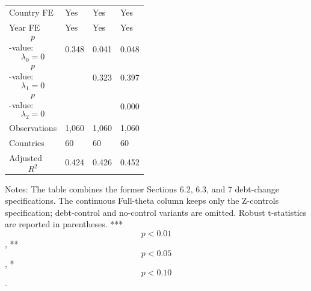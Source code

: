 \begin{table}[H]
\begin{threeparttable}
\begin{tabularx}{\textwidth}{lYYY}
Country FE & Yes & Yes & Yes \\
Year FE & Yes & Yes & Yes \\
$$p$$-value: $$\lambda_0=0$$ & 0.348 & 0.041 & 0.048 \\
$$p$$-value: $$\lambda_1=0$$ &  & 0.323 & 0.397 \\
$$p$$-value: $$\lambda_2=0$$ &  &  & 0.000 \\
Observations & 1,060 & 1,060 & 1,060 \\
Countries & 60 & 60 & 60 \\
Adjusted $$R^2$$ & 0.424 & 0.426 & 0.452 \\
\bottomrule
\end{tabularx}
\begin{tablenotes}[flushleft]\footnotesize
\item Notes: The table combines the former Sections 6.2, 6.3, and 7 debt-change specifications. The continuous Full-theta column keeps only the Z-controls specification; debt-control and no-control variants are omitted. Robust t-statistics are reported in parentheses. *** $$p<0.01$$, ** $$p<0.05$$, * $$p<0.10$$.
\end{tablenotes}
\end{threeparttable}
\end{table}
